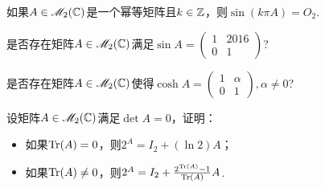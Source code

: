 \begin{problem}
  如果$A\in\mathscr M_2(\mathbb C)$是一个幂等矩阵且$k\in\mathbb Z$，则$\sin(k\pi A)=O_2$.
\end{problem}

\begin{problem}
  \begin{enumerate*}[left=0pt,label=(\alph*),itemjoin=\\]
    \item 是否存在矩阵$A\in\mathscr M_2(\mathbb C)$满足$\sin A=\begin{pmatrix}
          1 & 2016 \\
          0 & 1
        \end{pmatrix}$?
    \item 是否存在矩阵$A\in\mathscr M_2(\mathbb C)$使得$\cosh A=\begin{pmatrix}
          1 & \alpha \\
          0 & 1
        \end{pmatrix},\alpha\ne0$?
  \end{enumerate*}
\end{problem}

\begin{problem}
  设矩阵$A\in\mathscr M_2(\mathbb C)$满足$\det A=0$，证明：
  \begin{itemize}
    \item 如果$\operatorname{Tr}(A)=0$，则$2^A=I_2+(\ln2)A$；
    \item 如果$\operatorname{Tr}(A)\ne0$，则$2^A=I_2+\frac{2^{\operatorname{Tr}(A)}-1}{\operatorname{Tr}(A)}A$.
  \end{itemize}
\end{problem}

